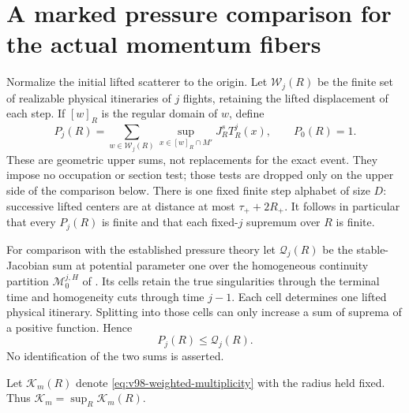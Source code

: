 \section{A marked pressure comparison for the actual momentum fibers}
\label{sec:v99-pressure}
Normalize the initial lifted scatterer to the origin. Let
$\mathcal W_j(R)$ be the finite set of realizable physical itineraries
of $j$ flights, retaining the lifted displacement of each step. If
$[w]_R$ is the regular domain of $w$, define
\begin{equation}\label{eq:v99-word-sum}
 P_j(R)=\sum_{w\in\mathcal W_j(R)}
       \sup_{x\in[w]_R\cap M'}J^s_RT_R^j(x),\qquad P_0(R)=1.
\end{equation}
These are geometric upper sums, not replacements for the exact event.
They impose no occupation or section test; those tests are dropped
only on the upper side of the comparison below. There is one fixed
finite step alphabet of size $D$: successive lifted centers are at
distance at most $\tau_++2R_+$. It follows in particular that every
$P_j(R)$ is finite and that each fixed-$j$ supremum over $R$ is finite.

For comparison with the established pressure theory let
$\mathcal Q_j(R)$ be the stable-Jacobian sum at potential parameter
one over the homogeneous continuity partition
$\mathcal M_0^{j,H}$ of \cite[equations (2.4), (2.11)]{BDPressure}.
Its cells retain the true singularities through the terminal time and
homogeneity cuts through time $j-1$. Each cell determines one lifted
physical itinerary. Splitting into those cells can only increase a
sum of suprema of a positive function. Hence
\begin{equation}\label{eq:v99-pressure-domination}
                         P_j(R)\le\mathcal Q_j(R).
\end{equation}
No identification of the two sums is asserted.

Let $\mathcal K_m(R)$ denote \eqref{eq:v98-weighted-multiplicity}
with the radius held fixed. Thus $\mathcal K_m=\sup_R\mathcal K_m(R)$.

